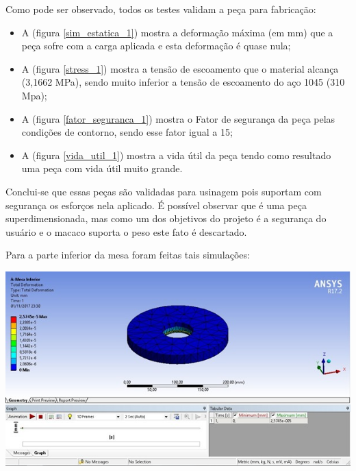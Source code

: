 
    Como pode ser observado, todos os testes validam a peça para fabricação:

    \begin{itemize}
        \item A (figura \ref{sim_estatica_1}) mostra a deformação máxima (em mm) que a peça sofre com a carga aplicada e esta deformação é quase nula;
        \item A (figura \ref{stress_1}) mostra a tensão de escoamento que o material alcança (3,1662 MPa), sendo muito inferior a tensão de escoamento do aço 1045 (310 Mpa);
        \item A (figura \ref{fator_seguranca_1}) mostra o Fator de segurança da peça pelas condições de contorno, sendo esse fator igual a 15;
        \item A (figura \ref{vida_util_1}) mostra a vida útil da peça tendo como resultado uma peça com vida útil muito grande.
    \end{itemize}
  
    Conclui-se que essas peças são validadas para usinagem pois suportam com segurança os esforços nela aplicado. É possível observar que é uma peça superdimensionada, mas como um dos objetivos do projeto é a segurança do usuário e o macaco suporta o peso este fato é descartado.

    Para a parte inferior da mesa foram feitas tais simulações:

    \begin{center}
    	\includegraphics[scale=0.7]{figuras/modal_corpo_livre_1}
        \label{modal_corpo_livre_1}
    \end{center}

